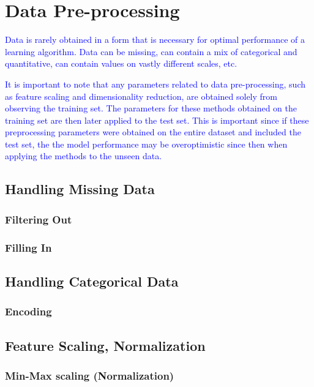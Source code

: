 \section{Data Pre-processing}

\textcolor{blue}{Data is rarely obtained in a form that is necessary for optimal performance of a learning algorithm. Data can be missing, can contain a mix of categorical and quantitative, can contain values on vastly different scales, etc.}

\textcolor{blue}{It is important to note that any parameters related to data pre-processing, such as feature scaling and dimensionality reduction, are obtained solely from observing the training set. The parameters for these methods obtained on the training set are then later applied to the test set. This is important since if these preprocessing parameters were obtained on the entire dataset and included the test set, the the model performance may be overoptimistic since then when applying the methods to the unseen data.}

\subsection{Handling Missing Data}

\subsubsection{Filtering Out}

\subsubsection{Filling In}

\subsection{Handling Categorical Data}

\subsubsection{Encoding}

\subsection{Feature Scaling, Normalization}

\subsubsection{Min-Max scaling (Normalization)}


